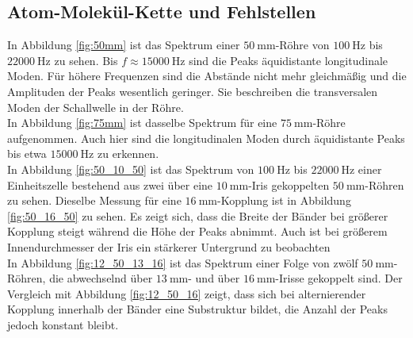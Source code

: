 \subsection{Atom-Molekül-Kette und Fehlstellen}
In Abbildung \ref{fig:50mm} ist das Spektrum einer $\SI{50}{\milli\meter}$-Röhre von $\SI{100}{\hertz}$ bis $\SI{22000}{\hertz}$ zu sehen. Bis $f\approx\SI{15000}{\hertz}$
sind die Peaks äquidistante longitudinale Moden. Für höhere Frequenzen sind die Abstände nicht mehr gleichmäßig und die Amplituden der Peaks wesentlich geringer. Sie beschreiben die transversalen Moden der Schallwelle in der Röhre.\\
In Abbildung \ref{fig:75mm} ist dasselbe Spektrum für eine $\SI{75}{\milli\meter}$-Röhre aufgenommen. Auch hier sind die longitudinalen Moden durch äquidistante Peaks bis etwa $\SI{15000}{\hertz}$ zu erkennen.\\
In Abbildung \ref{fig:50_10_50} ist das Spektrum von $\SI{100}{\hertz}$ bis $\SI{22000}{\hertz}$ einer Einheitszelle bestehend aus zwei über eine $\SI{10}{\milli\meter}$-Iris gekoppelten $\SI{50}{\milli\meter}$-Röhren zu sehen. Dieselbe Messung für eine $\SI{16}{\milli\meter}$-Kopplung ist in Abbildung \ref{fig:50_16_50} zu sehen. Es zeigt sich, dass die Breite der Bänder bei größerer Kopplung steigt während die Höhe der Peaks abnimmt. Auch ist bei größerem Innendurchmesser der Iris ein stärkerer Untergrund zu beobachten\\
In Abbildung \ref{fig:12_50_13_16} ist das Spektrum einer Folge von zwölf $\SI{50}{\milli\meter}$-Röhren, die abwechselnd über $\SI{13}{\milli\meter}$- und über $\SI{16}{\milli\meter}$-Irisse gekoppelt sind. Der Vergleich mit Abbildung \ref{fig:12_50_16} zeigt, dass sich bei alternierender Kopplung innerhalb der Bänder eine Substruktur bildet, die Anzahl der Peaks jedoch konstant bleibt.

